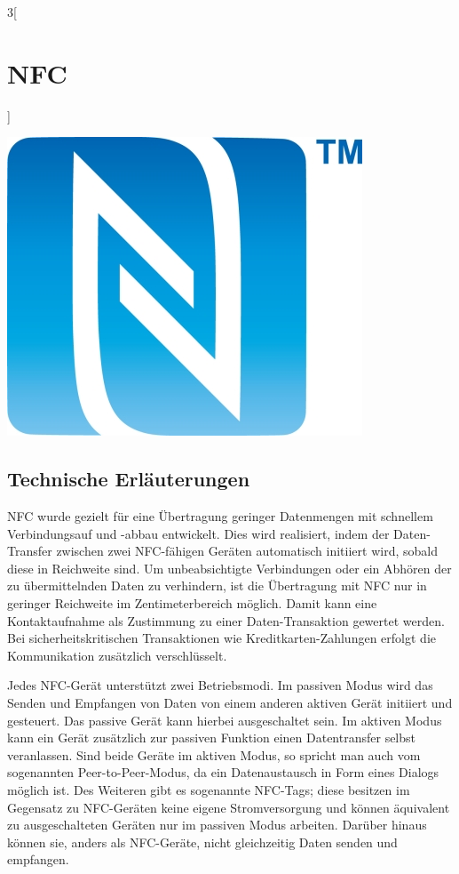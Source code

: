 \begin{multicols}{3}[\section{NFC}]
\begin{Figure}
\includegraphics[width=\linewidth]{Kapitel/NFC/Grafiken/Logo.jpg}
\label{fig:nfc.logo}
\end{Figure}

\subsection*{Technische Erläuterungen}
NFC wurde gezielt für eine Übertragung geringer Datenmengen mit schnellem Verbindungsauf und -abbau entwickelt. Dies wird realisiert, indem der Daten-Transfer zwischen zwei NFC-fähigen Geräten automatisch initiiert wird, sobald diese in Reichweite sind. Um unbeabsichtigte Verbindungen oder ein Abhören der zu übermittelnden Daten zu verhindern, ist die Übertragung mit NFC nur in geringer Reichweite im Zentimeterbereich möglich. Damit kann eine Kontaktaufnahme als Zustimmung zu einer Daten-Transaktion gewertet werden. Bei sicherheitskritischen Transaktionen wie Kreditkarten-Zahlungen erfolgt die Kommunikation zusätzlich verschlüsselt.

Jedes NFC-Gerät unterstützt zwei Betriebsmodi. Im passiven Modus wird das Senden und Empfangen von Daten von einem anderen aktiven Gerät initiiert und gesteuert. Das passive Gerät kann hierbei ausgeschaltet sein. Im aktiven Modus kann ein Gerät zusätzlich zur passiven Funktion einen Datentransfer selbst veranlassen. Sind beide Geräte im aktiven Modus, so spricht man auch vom sogenannten Peer-to-Peer-Modus, da ein Datenaustausch in Form eines Dialogs möglich ist. Des Weiteren gibt es sogenannte NFC-Tags; diese besitzen im Gegensatz zu NFC-Geräten keine eigene Stromversorgung und können äquivalent zu ausgeschalteten Geräten nur im passiven Modus arbeiten. Darüber hinaus können sie, anders als NFC-Geräte, nicht gleichzeitig Daten senden und empfangen.


\end{multicols}
